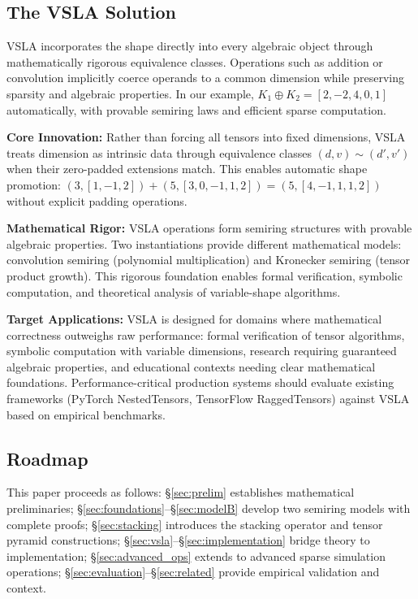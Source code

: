 \subsection{The VSLA Solution}
VSLA incorporates the shape directly into every algebraic object through mathematically rigorous equivalence classes.  Operations such as addition or convolution implicitly coerce operands to a common dimension while preserving sparsity and algebraic properties. In our example, $K_1 \oplus K_2 = [2, -2, 4, 0, 1]$ automatically, with provable semiring laws and efficient sparse computation.

\textbf{Core Innovation:} Rather than forcing all tensors into fixed dimensions, VSLA treats dimension as intrinsic data through equivalence classes $(d,v) \sim (d',v')$ when their zero-padded extensions match. This enables automatic shape promotion: $(3,[1,-1,2]) + (5,[3,0,-1,1,2]) = (5,[4,-1,1,1,2])$ without explicit padding operations.

\textbf{Mathematical Rigor:} VSLA operations form semiring structures with provable algebraic properties. Two instantiations provide different mathematical models: convolution semiring (polynomial multiplication) and Kronecker semiring (tensor product growth). This rigorous foundation enables formal verification, symbolic computation, and theoretical analysis of variable-shape algorithms.

\textbf{Target Applications:} VSLA is designed for domains where mathematical correctness outweighs raw performance: formal verification of tensor algorithms, symbolic computation with variable dimensions, research requiring guaranteed algebraic properties, and educational contexts needing clear mathematical foundations. Performance-critical production systems should evaluate existing frameworks (PyTorch NestedTensors, TensorFlow RaggedTensors) against VSLA based on empirical benchmarks.

\subsection{Roadmap}
This paper proceeds as follows: \S\ref{sec:prelim} establishes mathematical preliminaries; \S\ref{sec:foundations}–\S\ref{sec:modelB} develop two semiring models with complete proofs; \S\ref{sec:stacking} introduces the stacking operator and tensor pyramid constructions; \S\ref{sec:vsla}–\S\ref{sec:implementation} bridge theory to implementation; \S\ref{sec:advanced_ops} extends to advanced sparse simulation operations; \S\ref{sec:evaluation}–\S\ref{sec:related} provide empirical validation and context.
